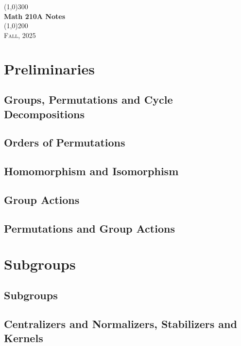 \documentclass[a4paper, openany]{book}
\begin{document}
\begin{titlepage}
    \begin{center}
        \line(1,0){300} \\
        [0.25in]
        \huge{\bfseries Math 210A Notes} \\
        [2mm]
        \line(1,0){200} \\
        [1.5cm]
        \textsc{\LARGE Fall, 2025}
    \end{center}
\end{titlepage}

\tableofcontents
\setcounter{section}{0}

\chapter{Preliminaries}
\section{Groups, Permutations and Cycle Decompositions}

\newpage

\section{Orders of Permutations}

\newpage

\section{Homomorphism and Isomorphism}

\newpage

\section{Group Actions}

\newpage

\section{Permutations and Group Actions}

\newpage

\chapter{Subgroups}
\section{Subgroups}

\newpage

\section{Centralizers and Normalizers, Stabilizers and Kernels}

\newpage
\end{document}
